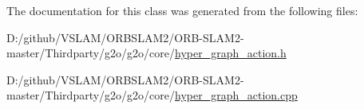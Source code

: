 The documentation for this class was generated from the following files\+:\begin{DoxyCompactItemize}
\item 
D\+:/github/\+V\+S\+L\+A\+M/\+O\+R\+B\+S\+L\+A\+M2/\+O\+R\+B-\/\+S\+L\+A\+M2-\/master/\+Thirdparty/g2o/g2o/core/\mbox{\hyperlink{hyper__graph__action_8h}{hyper\+\_\+graph\+\_\+action.\+h}}\item 
D\+:/github/\+V\+S\+L\+A\+M/\+O\+R\+B\+S\+L\+A\+M2/\+O\+R\+B-\/\+S\+L\+A\+M2-\/master/\+Thirdparty/g2o/g2o/core/\mbox{\hyperlink{hyper__graph__action_8cpp}{hyper\+\_\+graph\+\_\+action.\+cpp}}\end{DoxyCompactItemize}
